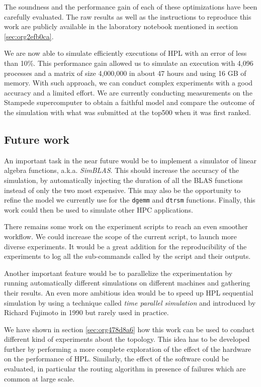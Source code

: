 \documentclass[12pt, a4paper]{memoir}
\begin{document}
The soundness and the performance gain of each of these optimizations have been carefully evaluated. The raw
results as well as the instructions to reproduce this work are publicly available in the laboratory notebook
mentioned in section \ref{sec:org2efb0ca}.

We are now able to simulate efficiently executions of HPL with an error of less than 10\%. This performance gain
allowed us to simulate an execution with 4,096 processes and a matrix of size 4,000,000 in about 47 hours and using 16
GB of memory. With such approach, we can conduct complex experiments with a good accuracy and a limited effort. We are
currently conducting measurements on the Stampede supercomputer to obtain a faithful model and compare the outcome of
the simulation with what was submitted at the top500 when it was first ranked.
\subsection{Future work}
\label{sec:orgc904672}
An important task in the near future would be to implement a simulator of linear algebra functions,
a.k.a. \emph{SimBLAS}. This should increase the accuracy of the simulation, by automatically injecting the duration of all
the BLAS functions instead of only the two most expensive. This may also be the opportunity to refine the model we
currently use for the \texttt{dgemm} and \texttt{dtrsm} functions. Finally, this work could then be used to simulate other HPC
applications.

There remains some work on the experiment scripts to reach an even smoother workflow. We could increase the scope of
the current script, to launch more diverse experiments. It would be a great addition for the reproducibility of the
experiments to log all the sub-commands called by the script and their outputs.

Another important feature would be to parallelize the experimentation by running automatically different simulations
on different machines and gathering their results. An even more ambitious idea would be to speed up HPL sequential
simulation by using a technique called \emph{time parallel simulation} and introduced by Richard Fujimoto in 1990 but
rarely used in practice.

We have shown in section \ref{sec:org478d8a6} how this work can be used to conduct different kind of experiments about
the topology. This idea has to be developed further by performing a more complete exploration of the effect of the
hardware on the performance of HPL. Similarly, the effect of the software could be evaluated, in particular the
routing algorithm in presence of failures which are common at large scale.



\end{document}
